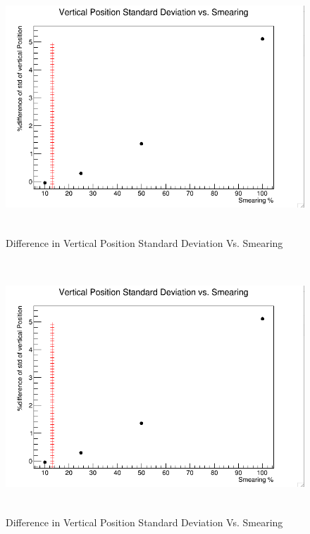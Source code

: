 \documentclass[./Thesis]{subfiles}
\begin{document}
\begin{figure}
	\centerline{\includegraphics[height=95mm]{stdVerticalSmear.png}}
	\caption[stdVerticalSmear]{Difference in Vertical Position Standard Deviation Vs. Smearing}
	\label{fig:StdVertSmear}
\end{figure} 			
		
\begin{figure}
	\centerline{\includegraphics[height=95mm]{stdVerticalSmear.png}}
	\caption[stdVerticalSmear]{Difference in Vertical Position Standard Deviation Vs. Smearing}
	\label{fig:StdVertSmear}
\end{figure} 
	
\end{document}

